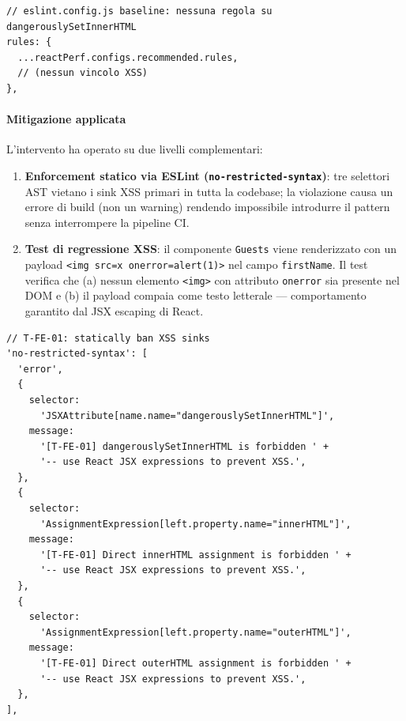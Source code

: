 ﻿\documentclass[a4paper,12pt]{report}
\begin{document}
\begin{insecurebox}[title={Assenza di guard statico --- nessuna regola ESLint impediva il pattern}]
\begin{lstlisting}[style=typescript]
// eslint.config.js baseline: nessuna regola su dangerouslySetInnerHTML
rules: {
  ...reactPerf.configs.recommended.rules,
  // (nessun vincolo XSS)
},
\end{lstlisting}
\end{insecurebox}

\paragraph{Mitigazione applicata}
L'intervento ha operato su due livelli complementari:

\begin{enumerate}
  \item \textbf{Enforcement statico via ESLint (\texttt{no-restricted-syntax})}:
        tre selettori AST vietano i sink XSS primari in tutta la codebase;
        la violazione causa un errore di build (non un warning) rendendo impossibile
        introdurre il pattern senza interrompere la pipeline CI.
  \item \textbf{Test di regressione XSS}: il componente \texttt{Guests} viene
        renderizzato con un payload \texttt{<img src=x onerror=alert(1)>} nel campo
        \texttt{firstName}. Il test verifica che (a) nessun elemento \texttt{<img>}
        con attributo \texttt{onerror} sia presente nel DOM e (b) il payload compaia
        come testo letterale --- comportamento garantito dal JSX escaping di React.
\end{enumerate}

\begin{securebox}[title={eslint.config.js --- no-restricted-syntax vieta i sink XSS}]
\begin{lstlisting}[style=typescript]
// T-FE-01: statically ban XSS sinks
'no-restricted-syntax': [
  'error',
  {
    selector:
      'JSXAttribute[name.name="dangerouslySetInnerHTML"]',
    message:
      '[T-FE-01] dangerouslySetInnerHTML is forbidden ' +
      '-- use React JSX expressions to prevent XSS.',
  },
  {
    selector:
      'AssignmentExpression[left.property.name="innerHTML"]',
    message:
      '[T-FE-01] Direct innerHTML assignment is forbidden ' +
      '-- use React JSX expressions to prevent XSS.',
  },
  {
    selector:
      'AssignmentExpression[left.property.name="outerHTML"]',
    message:
      '[T-FE-01] Direct outerHTML assignment is forbidden ' +
      '-- use React JSX expressions to prevent XSS.',
  },
],
\end{lstlisting}
\end{securebox}
\end{document}
